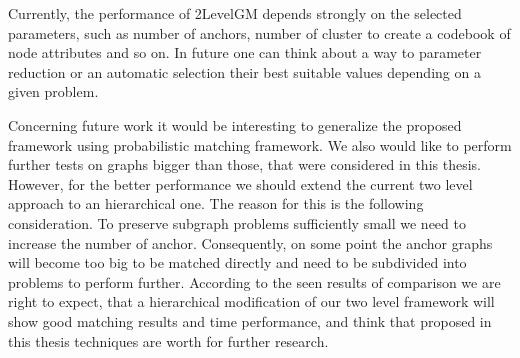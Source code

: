 Currently, the performance of 2LevelGM depends strongly on the selected parameters, such as number of anchors, number of cluster to create a codebook of node attributes and so on. In future one can think about a way to parameter reduction or an automatic selection their best suitable values depending on a given problem. %

Concerning future work it would be interesting to generalize the proposed framework using probabilistic matching framework. We also would like to perform further tests on graphs bigger than those, that were considered in this thesis. However, for the better performance we should extend the current two level approach to an hierarchical one. The reason for this is the following consideration. To preserve subgraph problems sufficiently small we need to increase the number of anchor. Consequently, on some point the anchor graphs will become too big to be matched directly and need to be subdivided into problems to perform further. According to the seen results of comparison we are right to expect, that a hierarchical modification of our two level framework will show good matching results and time performance, and think that proposed in this thesis techniques are worth for further research.

 
